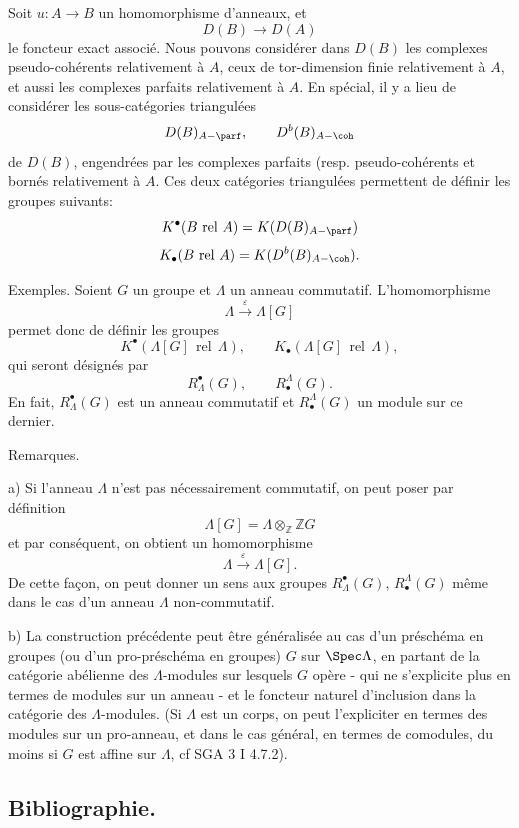 Soit $u:A\to B$ un homomorphisme d'anneaux, et
\[
D(B)\longrightarrow D(A)
\]
le foncteur exact associé. Nous pouvons considérer dans $D(B)$ les complexes pseudo-cohérents relativement à $A$, ceux de tor-dimension finie relativement à $A$, et aussi les complexes parfaits relativement à $A$. En spécial, il y a lieu de considérer les sous-catégories triangulées
\[
D(B)_{A-\parf},\qquad D^b(B)_{A-\coh}
\]
de $D(B)$, engendrées par les complexes parfaits (resp. pseudo-cohérents et bornés relativement à $A$. Ces deux catégories triangulées permettent de définir les groupes suivants:
\[
K^{\bullet}(B\operatorname{\,rel\,}A)=K(D(B)_{A-\parf})
\]
\[
K_\bullet(B\operatorname{\,rel\,}A)=K(D^b(B)_{A-\coh}).
\]

Exemples. Soient $G$ un groupe et $\Lambda$ un anneau commutatif. L'homomorphisme
\[
\Lambda\xrightarrow{\varepsilon}\Lambda[G]
\]
permet donc de définir les groupes
\[
K^{\bullet}(\Lambda[G]\operatorname{\,rel\,}\Lambda),\qquad
K_\bullet(\Lambda[G]\operatorname{\,rel\,}\Lambda),
\]
qui seront désignés par
\[
R^{\bullet}_\Lambda(G),\qquad R^\Lambda_\bullet(G).
\]
En fait, $R^{\bullet}_\Lambda(G)$ est un anneau commutatif et $R^\Lambda_\bullet(G)$ un module sur ce dernier.

Remarques.

a) Si l'anneau $\Lambda$ n'est pas nécessairement commutatif, on peut poser par définition
\[
\Lambda[G]=\Lambda\otimes_{\mathbb{Z}}\mathbb{Z}G
\]
et par conséquent, on obtient un homomorphisme
\[
\Lambda\xrightarrow{\varepsilon}\Lambda[G].
\]
De cette façon, on peut donner un sens aux groupes $R^{\bullet}_\Lambda(G)$, $R^\Lambda_\bullet(G)$ même dans le cas d'un anneau $\Lambda$ non-commutatif.

b) La construction précédente peut être généralisée au cas d'un préschéma en groupes (ou d'un pro-préschéma en groupes) $G$ sur $\Spec\Lambda$, en partant de la catégorie abélienne des $\Lambda$-modules sur lesquels $G$ opère - qui ne s'explicite plus en termes de modules sur un anneau - et le foncteur naturel d'inclusion dans la catégorie des $\Lambda$-modules. (Si $\Lambda$ est un corps, on peut l'expliciter en termes des modules sur un pro-anneau, et dans le cas général, en termes de comodules, du moins si $G$ est affine sur $\Lambda$, cf SGA 3 I 4.7.2).

\subsection*{Bibliographie.}

